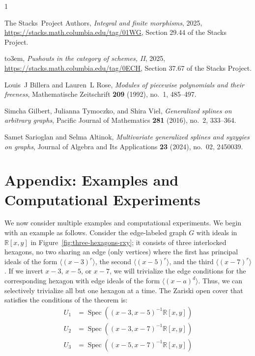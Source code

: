 \documentclass{article}
\newcommand{\R}{\mathbb R}
\DeclareMathOperator{\Spec}{Spec}
\begin{document}
\providecommand{\bysame}{\leavevmode\hbox to3em{\hrulefill}\thinspace}
\providecommand{\MR}{\relax\ifhmode\unskip\space\fi MR }
\providecommand{\MRhref}[2]{%
  \href{http://www.ams.org/mathscinet-getitem?mr=#1}{#2}
}
\providecommand{\href}[2]{#2}
\begin{thebibliography}{1}

The Stacks~Project Authors, \emph{Integral and finite morphisms}, 2025,
  \url{https://stacks.math.columbia.edu/tag/01WG}, Section 29.44 of the Stacks
  Project.

\bysame, \emph{Pushouts in the category of schemes, {II}}, 2025,
  \url{https://stacks.math.columbia.edu/tag/0ECH}, Section 37.67 of the Stacks
  Project.

Louis~J Billera and Lauren~L Rose, \emph{Modules of piecewise polynomials and
  their freeness}, Mathematische Zeitschrift \textbf{209} (1992), no.~1,
  485--497.

Simcha Gilbert, Julianna Tymoczko, and Shira Viel, \emph{Generalized splines on
  arbitrary graphs}, Pacific Journal of Mathematics \textbf{281} (2016), no.~2,
  333--364.

Samet Sarioglan and Selma Altinok, \emph{Multivariate generalized splines and
  syzygies on graphs}, Journal of Algebra and Its Applications \textbf{23}
  (2024), no.~02, 2450039.

\end{thebibliography}





\section*{Appendix: Examples and Computational Experiments}
We now consider multiple examples and computational experiments. We begin with an example as follows. Consider the edge-labeled graph $G$ with ideals in $\R[x,y]$ in Figure~\ref{fig:three-hexagons-rxy}; it consists of three interlocked hexagons, no two sharing an edge (only vertices) where the first has principal ideals of the form $\langle (x - 3)^r \rangle$, the second $\langle (x - 5)^r \rangle$, and the third $\langle (x - 7)^r \rangle$. If we invert $x-3$, $x-5$, or $x-7$, we will trivialize the edge conditions for the corresponding hexagon with edge ideals of the form $\langle (x-a)^d \rangle$. Thus, we can selectively trivialize all but one hexagon at a time. The Zariski open cover that satisfies the conditions of the theorem is:
\begin{align*}
  U_1 &= \Spec((x-3, x-5)^{-1}\R[x,y]) \\
  U_2 &= \Spec((x-3, x-7)^{-1}\R[x,y]) \\
  U_3 &= \Spec((x-5, x-7)^{-1}\R[x,y])
\end{align*}
\end{document}
